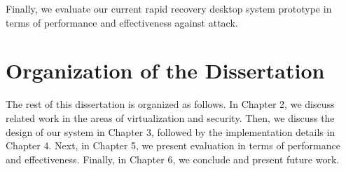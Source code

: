 Finally, we evaluate our current rapid recovery desktop system prototype in terms of performance and effectiveness against attack.

\section{Organization of the Dissertation}

The rest of this dissertation is organized as follows. In Chapter 2, we discuss related work in the areas of virtualization and security. Then, we discuss the design of our system in Chapter 3, followed by the implementation details in Chapter 4. Next, in Chapter 5, we present evaluation in terms of performance and effectiveness. Finally, in Chapter 6, we conclude and present future work.


